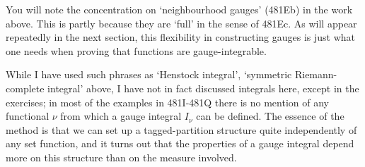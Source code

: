 {You will note the concentration on `neighbourhood gauges' (481Eb)
in the work above.   This is partly because they are `full' in the sense of
481Ec.   As
will appear repeatedly in the next section, this flexibility in
constructing gauges is just what one needs when proving that functions
are gauge-integrable.

While I have used such phrases as `Henstock integral', `symmetric
Riemann-complete integral' above, I have not in fact discussed
integrals here, except in the exercises;  in most of the examples in
481I-481Q there is no mention of any functional $\nu$ from which a gauge
integral $I_{\nu}$ can be defined.   The essence of the method is that
we can set up a tagged-partition structure quite independently of any
set function, and it turns out that the properties of a gauge integral
depend more on this structure than on the measure involved.
}%

\discrpage


